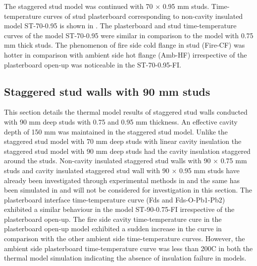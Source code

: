 The staggered stud model was continued with 70 $\times$ 0.95 mm studs. Time-temperature curves of stud plasterboard corresponding to non-cavity insulated model ST-70-0.95 is shown in . The plasterboard and stud time-temperature curves of the model ST-70-0.95 were similar in comparison to the model with 0.75 mm thick studs. The phenomenon of fire side cold flange in stud (Fire-CF) was hotter in comparison with ambient side hot flange (Amb-HF) irrespective of the plasterboard open-up was noticeable in the ST-70-0.95-FI.

\subsection{Staggered stud walls with 90 mm studs}

This section details the thermal model results of staggered stud walls conducted with 90 mm deep studs with 0.75 and 0.95 mm thickness. An effective cavity depth of 150 mm was maintained in the staggered stud model. Unlike the staggered stud model with 70 mm deep studs with linear cavity insulation the staggered stud model with 90 mm deep studs had the cavity insulation staggered around the studs. Non-cavity insulated staggered stud walls with 90 $\times$ 0.75 mm studs and cavity insulated staggered stud wall with 90 $\times$ 0.95 mm studs have already been investigated through experimental methods in  and the same has been simulated in  and will not be considered for investigation in this section. The plasterboard interface time-temperature curve (Fds and Fds-O-Pb1-Pb2) exhibited a similar behaviour in the model ST-90-0.75-FI irrespective of the plasterboard open-up. The fire side cavity time-temperature cure in the plasterboard open-up model exhibited a sudden increase in the curve in comparison with the other ambient side time-temperature curves. However, the ambient side plasterboard time-temperature curve was less than 200\degree C in both the thermal model simulation indicating the absence of insulation failure in models.   

